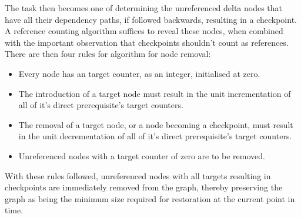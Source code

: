 The task then becomes one of determining the unreferenced delta nodes that have all their dependency paths, if followed backwards, resulting in a checkpoint.
A reference counting algorithm suffices to reveal these nodes, when combined with the important observation that checkpoints shouldn't count as references.
There are then four rules for algorithm for node removal:
\begin{itemize}
	\item Every node has an target counter, as an integer, initialised at zero.
	\item The introduction of a target node must result in the unit incrementation of all of it's direct prerequisite's target counters.
	\item The removal of a target node, or a node becoming a checkpoint, must result in the unit decrementation of all of it's direct prerequisite's target counters.
	\item Unreferenced nodes with a target counter of zero are to be removed.
\end{itemize}
With these rules followed, unreferenced nodes with all targets resulting in checkpoints are immediately removed from the graph, thereby preserving the graph as being the minimum size required for restoration at the current point in time.
